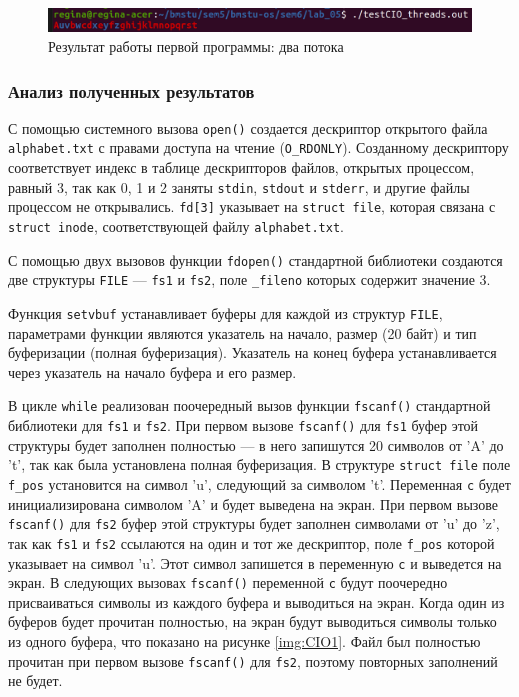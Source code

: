 \begin{figure}[H]
	\begin{center}
		\includegraphics[scale=0.35]{img/CIO2.png}
	\end{center}
	\captionsetup{justification=centering}
	\caption{Результат работы первой программы: два потока}
	\label{img:CIO2}
\end{figure}

\subsubsection{Анализ полученных результатов}

С помощью системного вызова \texttt{open()} создается дескриптор открытого файла \texttt{alphabet.txt} с правами доступа на чтение (\texttt{O\_RDONLY}). Созданному дескриптору соответствует индекс в таблице дескрипторов файлов, открытых процессом, равный 3, так как 0, 1 и 2 заняты \texttt{stdin}, \texttt{stdout} и \texttt{stderr}, и другие файлы процессом не открывались. \texttt{fd[3]} указывает на \texttt{struct file}, которая связана с \texttt{struct inode}, соответствующей файлу \texttt{alphabet.txt}.

С помощью двух вызовов функции \texttt{fdopen()} стандартной библиотеки создаются две структуры \texttt{FILE} --- \texttt{fs1} и \texttt{fs2}, поле \texttt{\_fileno} которых содержит значение 3.

Функция \texttt{setvbuf} устанавливает буферы для каждой из структур \texttt{FILE}, параметрами функции являются указатель на начало, размер (20 байт) и тип буферизации (полная буферизация). Указатель на конец буфера устанавливается через указатель на начало буфера и его размер.

В цикле \texttt{while} реализован поочередный вызов функции \texttt{fscanf()} стандартной библиотеки для \texttt{fs1} и \texttt{fs2}. При первом вызове \texttt{fscanf()} для \texttt{fs1} буфер этой структуры будет заполнен полностью --- в него запишутся 20 символов от 'A' до 't', так как была установлена полная буферизация. В структуре \texttt{struct file} поле \texttt{f\_pos} установится на символ 'u', следующий за символом 't'. Переменная \texttt{c} будет инициализирована символом 'A' и будет выведена на экран. При первом вызове \texttt{fscanf()} для \texttt{fs2} буфер этой структуры будет заполнен символами от 'u' до 'z', так как \texttt{fs1} и \texttt{fs2} ссылаются на один и тот же дескриптор, поле \texttt{f\_pos} которой  указывает на символ 'u'. Этот символ запишется в переменную \texttt{c} и выведется на экран. В следующих вызовах \texttt{fscanf()} переменной \texttt{c} будут поочередно присваиваться символы из каждого буфера и выводиться на экран. Когда один из буферов будет прочитан полностью, на экран будут выводиться символы только из одного буфера, что показано на рисунке \ref{img:CIO1}. Файл был полностью прочитан при первом вызове \texttt{fscanf()} для \texttt{fs2}, поэтому повторных заполнений не будет.

